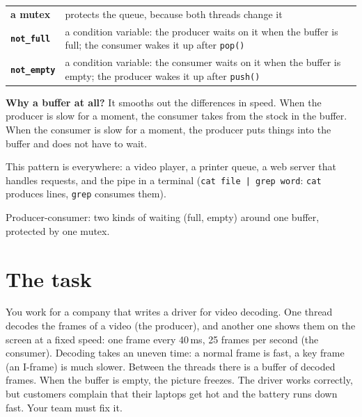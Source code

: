 \begin{center}
\renewcommand{\arraystretch}{1.2}
\begin{tabularx}{\linewidth}{@{}lX@{}}
\toprule
\textbf{a mutex} & protects the queue, because both threads change it \\
\textbf{\texttt{not\_full}} & a condition variable: the producer waits on it when the buffer is full; the consumer
  wakes it up after \texttt{pop()} \\
\textbf{\texttt{not\_empty}} & a condition variable: the consumer waits on it when the buffer is empty; the producer
  wakes it up after \texttt{push()} \\
\bottomrule
\end{tabularx}
\end{center}

\textbf{Why a buffer at all?} It smooths out the differences in speed. When the producer is slow for a moment,
the consumer takes from the stock in the buffer. When the consumer is slow for a moment, the producer puts things
into the buffer and does not have to wait.

This pattern is everywhere: a video player, a printer queue, a web server that handles requests, and the pipe in
a terminal (\texttt{cat file | grep word}: \texttt{cat} produces lines, \texttt{grep} consumes them).

\begin{keymsg}
Producer-consumer: two kinds of waiting (full, empty) around one buffer, protected by one mutex.
\end{keymsg}

\section{The task}

\begin{story}
You work for a company that writes a driver for video decoding. One thread decodes the frames of a video (the
producer), and another one shows them on the screen at a fixed speed: one frame every 40\,ms, 25 frames per
second (the consumer). Decoding takes an uneven time: a normal frame is fast, a key frame (an I-frame) is much
slower. Between the threads there is a buffer of decoded frames. When the buffer is empty, the picture freezes.
The driver works correctly, but customers complain that their laptops get hot and the battery runs down fast.
Your team must fix it.
\end{story}

